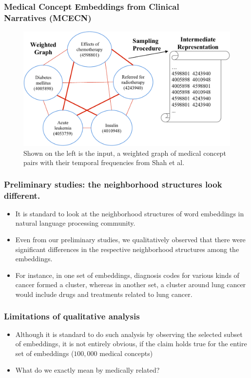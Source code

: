 \documentclass{beamer}
\begin{document}
\begin{frame}
\frametitle{Medical Concept Embeddings from
Clinical \\ Narratives (MCECN)}
\begin{figure}[t]
    \centering 
    \includegraphics[width=0.8\linewidth]{figs/Figure1-transform.pdf}
    \caption{ \scriptsize
Shown on the left is the input, a weighted graph
of medical concept pairs with their
temporal frequencies from Shah et al.}  
\end{figure}
\end{frame}

\begin{frame}
\frametitle{Preliminary studies: the neighborhood
structures look different.}
\begin{itemize}
\item It is standard to look at the neighborhood
structures of word embeddings in natural language
processing community.

\bigskip

\item Even from our preliminary studies,
we qualitatively observed that there were significant differences in the respective neighborhood structures
among the embeddings.

\bigskip

\item For instance, in one set of embeddings, diagnosis
codes for various kinds of cancer formed a cluster, whereas in another set, a cluster
around lung cancer would include drugs and treatments related to lung cancer.

\end{itemize}
\end{frame}

\begin{frame}
\frametitle{Limitations of qualitative analysis}
\begin{itemize}
\item Although it is standard to do such analysis
by observing the selected subset of embeddings,
it is not entirely obvious, if the claim holds
true for the entire set of embeddings ($100,000$ 
medical concepts) 

\bigskip

\item What do we exactly mean by medically
related? 

\end{itemize}
\end{frame}
\end{document}
